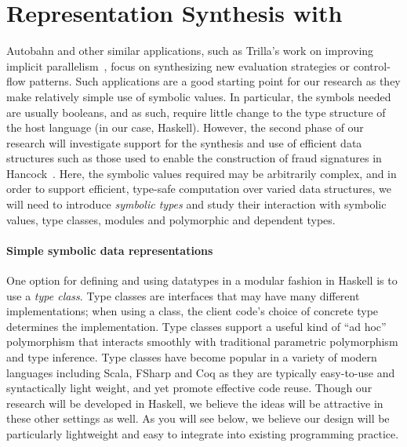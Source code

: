 \section{Representation Synthesis with \rasps}
\label{sec:representation-synthesis}

Autobahn and other similar applications, such as Trilla's work on
improving implicit parallelism~\cite{implicit-parallel}, focus on
synthesizing new evaluation strategies or control-flow patterns.  Such
applications are a good starting point for our research as they make
relatively simple use of symbolic values.  In particular, the symbols
needed are usually booleans, and as such, require little change to the
type structure of the host language (in our case, Haskell).  However,
the second phase of our research will investigate \rasp support for
the synthesis and use of efficient data structures such as those used
to enable the construction of fraud signatures in
Hancock~\cite{hancock}.  Here, the symbolic values required may be
arbitrarily complex, and in order to support efficient, type-safe
computation over varied data structures, we will need to introduce
\emph{symbolic types} and study their interaction with symbolic
values, type classes, modules and polymorphic and dependent
types.

\paragraph*{Simple symbolic data representations}
One option for defining and using datatypes in a modular fashion in Haskell is to use a \emph{type class}.
Type classes are interfaces that may have many different implementations; when using a class, the client
code's choice of concrete type determines the implementation.  Type classes support a useful kind of ``ad hoc''
polymorphism that interacts smoothly with traditional parametric polymorphism and type inference.  Type
classes have become popular in a variety of modern languages including Scala, FSharp and Coq as they
are typically easy-to-use and syntactically light weight, and yet promote effective code reuse.
Though our research
will be developed in Haskell, we believe the ideas will be attractive in these other settings as well.
As you will see below, we believe our design will be particularly lightweight and easy to integrate into
existing programming practice.

